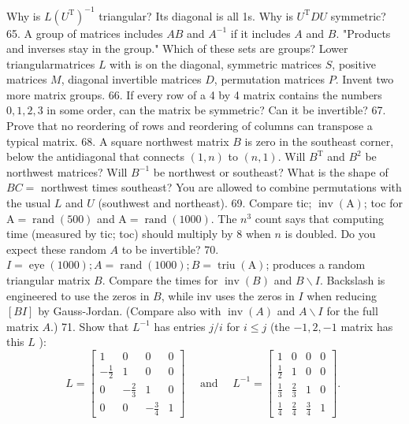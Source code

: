 Why is $L\left(U^{\mathrm{T}}\right)^{-1}$ triangular? Its diagonal is all 1s. Why is $U^{\mathrm{T}} D U$ symmetric?
65. A group of matrices includes $A B$ and $A^{-1}$ if it includes $A$ and $B$. "Products and inverses stay in the group." Which of these sets are groups? Lower triangularmatrices $L$ with is on the diagonal, symmetric matrices $S$, positive matrices $M$, diagonal invertible matrices $D$, permutation matrices $P$. Invent two more matrix groups.
66. If every row of a 4 by 4 matrix contains the numbers $0,1,2,3$ in some order, can the matrix be symmetric? Can it be invertible?
67. Prove that no reordering of rows and reordering of columns can transpose a typical matrix.
68. A square northwest matrix $B$ is zero in the southeast corner, below the antidiagonal that connects $(1, n)$ to $(n, 1)$. Will $B^{\mathrm{T}}$ and $B^2$ be northwest matrices? Will $B^{-1}$ be northwest or southeast? What is the shape of $B C=$ northwest times southeast? You are allowed to combine permutations with the usual $L$ and $U$ (southwest and northeast).
69. Compare tic; $\operatorname{inv}(\mathrm{A})$; toc for $\mathrm{A}=\operatorname{rand}(500)$ and $\mathrm{A}=\operatorname{rand}(1000)$. The $n^3$ count says that computing time (measured by tic; toc) should multiply by 8 when $n$ is doubled. Do you expect these random $A$ to be invertible?
70. $I=\operatorname{eye}(1000) ; A=\operatorname{rand}(1000) ; B=\operatorname{triu}(\mathrm{A})$; produces a random triangular matrix $B$. Compare the times for $\operatorname{inv}(B)$ and $B \backslash I$. Backslash is engineered to use the zeros in $B$, while inv uses the zeros in $I$ when reducing $[B I]$ by Gauss-Jordan. (Compare also with $\operatorname{inv}(A)$ and $A \backslash I$ for the full matrix $A$.)
71. Show that $L^{-1}$ has entries $j / i$ for $i \leq j$ (the $-1,2,-1$ matrix has this $L$ ):
$$
L=\left[\begin{array}{cccc}
1 & 0 & 0 & 0 \\
-\frac{1}{2} & 1 & 0 & 0 \\
0 & -\frac{2}{3} & 1 & 0 \\
0 & 0 & -\frac{3}{4} & 1
\end{array}\right] \quad \text { and } \quad L^{-1}=\left[\begin{array}{cccc}
1 & 0 & 0 & 0 \\
\frac{1}{2} & 1 & 0 & 0 \\
\frac{1}{3} & \frac{2}{3} & 1 & 0 \\
\frac{1}{4} & \frac{2}{4} & \frac{3}{4} & 1
\end{array}\right] \text {. }
$$
